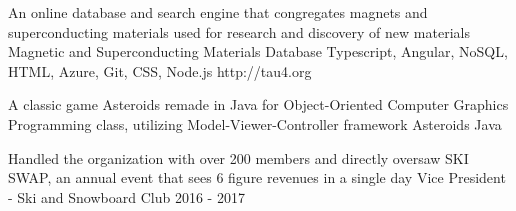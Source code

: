 \documentclass[]{awesome-cv}
\begin{document}
\vspace{-1mm}
\begin{cventries}
	\cventry
	{An online database and search engine that congregates magnets and superconducting materials used for research and discovery of new materials}
	{Magnetic and Superconducting Materials Database}
	{Typescript, Angular, NoSQL, HTML, Azure, Git, CSS, Node.js}
	{http://tau4.org}
	{}
	
	
	\cventry
	{A classic game Asteroids remade in Java for Object-Oriented Computer Graphics Programming class, utilizing Model-Viewer-Controller framework}
	{Asteroids}
	{Java}
	{}
	{}
	
	\vspace{-1mm}
\end{cventries}
\begin{cventries}
\cventry
    {Handled the organization with over 200 members and directly oversaw SKI SWAP, an annual event that sees 6 figure revenues in a single day}
    {Vice President - Ski and Snowboard Club}
    {}
    {2016 - 2017}
    {}
\end{cventries}
\ 
\end{document}
